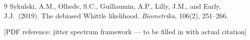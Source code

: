 \documentclass[12pt]{article}
\begin{document}
\bigskip
\begin{thebibliography}{9}
Sykulski, A.M., Olhede, S.C., Guillaumin, A.P., Lilly, J.M., and Early, J.J.\ (2019).
The debiased Whittle likelihood.
\emph{Biometrika}, 106(2), 251--266.

[PDF reference: jitter spectrum framework — to be filled in with actual citation]
\end{thebibliography}
\end{document}

